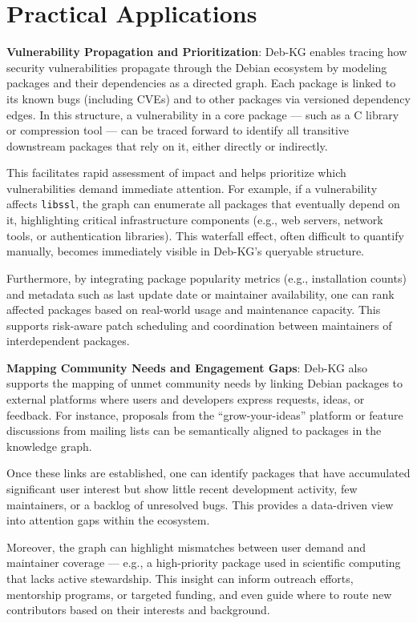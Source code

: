 \documentclass[10pt,oneside,a4paper, twocolumn]{article}
\begin{document}
    \section{Practical Applications}


    {\bf Vulnerability Propagation and Prioritization}: Deb-KG enables tracing how security vulnerabilities propagate through the Debian ecosystem by modeling packages and their dependencies as a directed graph. Each package is linked to its known bugs (including CVEs) and to other packages via versioned dependency edges. In this structure, a vulnerability in a core package — such as a C library or compression tool — can be traced forward to identify all transitive downstream packages that rely on it, either directly or indirectly.

    This facilitates rapid assessment of impact and helps prioritize which vulnerabilities demand immediate attention. For example, if a vulnerability affects \texttt{libssl}, the graph can enumerate all packages that eventually depend on it, highlighting critical infrastructure components (e.g., web servers, network tools, or authentication libraries). This waterfall effect, often difficult to quantify manually, becomes immediately visible in Deb-KG’s queryable structure.

    Furthermore, by integrating package popularity metrics (e.g., installation counts) and metadata such as last update date or maintainer availability, one can rank affected packages based on real-world usage and maintenance capacity. This supports risk-aware patch scheduling and coordination between maintainers of interdependent packages.

        {\bf Mapping Community Needs and Engagement Gaps}: Deb-KG also supports the mapping of unmet community needs by linking Debian packages to external platforms where users and developers express requests, ideas, or feedback. For instance, proposals from the “grow-your-ideas” platform or feature discussions from mailing lists can be semantically aligned to packages in the knowledge graph.

    Once these links are established, one can identify packages that have accumulated significant user interest but show little recent development activity, few maintainers, or a backlog of unresolved bugs. This provides a data-driven view into attention gaps within the ecosystem.

    Moreover, the graph can highlight mismatches between user demand and maintainer coverage — e.g., a high-priority package used in scientific computing that lacks active stewardship.
    This insight can inform outreach efforts, mentorship programs, or targeted funding, and even guide where to route new contributors based on their interests and background.
\end{document}
